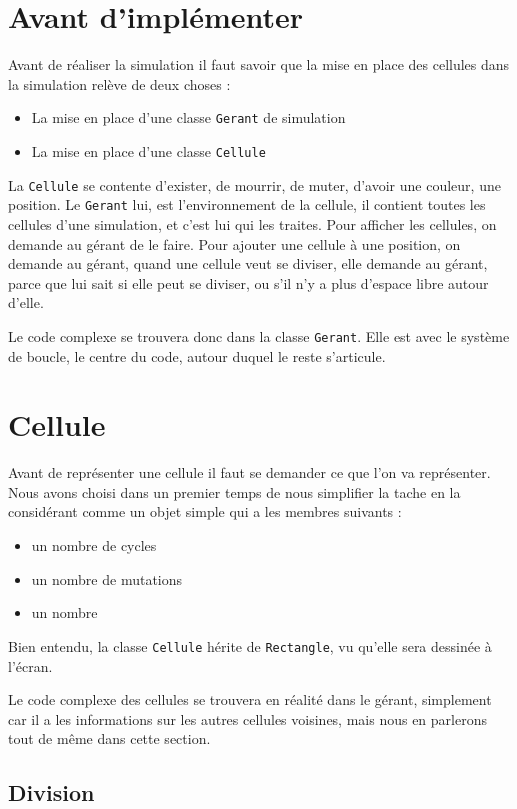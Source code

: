 \section{Avant d'implémenter}
Avant de réaliser la simulation il faut savoir que 
la mise en place des cellules dans la simulation relève de deux choses : 
\begin{itemize}
	\item La mise en place d'une classe \texttt{Gerant} de simulation
	\item La mise en place d'une classe \texttt{Cellule}
\end{itemize}

La \texttt{Cellule} se contente d'exister, de mourrir, de muter, d'avoir une couleur, une position. Le \texttt{Gerant} lui, est l'environnement de la cellule, il contient toutes les cellules d'une simulation, et c'est lui qui les traites. Pour afficher les cellules, on demande au gérant de le faire. Pour ajouter une cellule à une position, on demande au gérant, quand une cellule veut se diviser, elle demande au gérant, parce que lui sait si elle peut se diviser, ou s'il n'y a plus d'espace libre autour d'elle.

Le code complexe se trouvera donc dans la classe \texttt{Gerant}. Elle est avec le système de boucle, le centre du code, autour duquel le reste s'articule.

\section{Cellule}

Avant de représenter une cellule il faut se demander ce que l'on va représenter. Nous avons choisi dans un premier temps de nous simplifier la tache en la considérant comme un objet simple qui a les membres suivants : 
\begin{itemize}
	\item un nombre de cycles
	\item un nombre de mutations
	\item un nombre 
\end{itemize}

Bien entendu, la classe \texttt{Cellule} hérite de \texttt{Rectangle}, vu qu'elle sera dessinée à l'écran.

Le code complexe des cellules se trouvera en réalité dans le gérant, simplement car il a les informations sur les autres cellules voisines, mais nous en parlerons tout de même dans cette section.

\subsection{Division}

